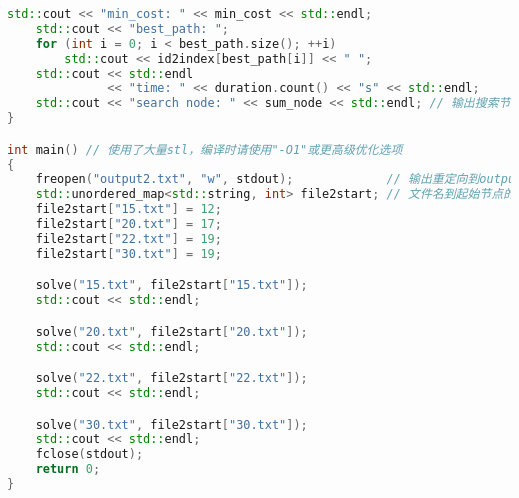 \documentclass[lang=cn,11pt,a4paper]{elegantpaper}
\begin{document}
\begin{lstlisting}[language=c++]
    std::cout << "min_cost: " << min_cost << std::endl;
    std::cout << "best_path: ";
    for (int i = 0; i < best_path.size(); ++i)
        std::cout << id2index[best_path[i]] << " ";
    std::cout << std::endl
              << "time: " << duration.count() << "s" << std::endl;
    std::cout << "search node: " << sum_node << std::endl; // 输出搜索节点数
}

int main() // 使用了大量stl，编译时请使用"-O1"或更高级优化选项
{
    freopen("output2.txt", "w", stdout);             // 输出重定向到output.txt
    std::unordered_map<std::string, int> file2start; // 文件名到起始节点的映射
    file2start["15.txt"] = 12;
    file2start["20.txt"] = 17;
    file2start["22.txt"] = 19;
    file2start["30.txt"] = 19;

    solve("15.txt", file2start["15.txt"]);
    std::cout << std::endl;

    solve("20.txt", file2start["20.txt"]);
    std::cout << std::endl;

    solve("22.txt", file2start["22.txt"]);
    std::cout << std::endl;

    solve("30.txt", file2start["30.txt"]);
    std::cout << std::endl;
    fclose(stdout);
    return 0;
}
\end{lstlisting}
\end{document}
